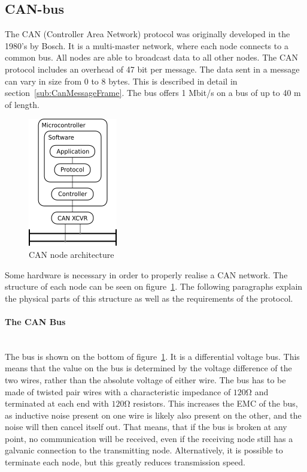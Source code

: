 
\subsection{CAN-bus}\label{sec:CAN-bus}
The CAN (Controller Area Network) protocol was originally developed in the 1980's by Bosch.
It is a multi-master network, where each node connects to a common bus.
All nodes are able to broadcast data to all other nodes.
The CAN protocol includes an overhead of 47 bit per message.
The data sent in a message can vary in size from 0 to 8 bytes.
This is described in detail in section~\ref{sub:CanMessageFrame}.
The bus offers 1 Mbit/s on a bus of up to 40 \si{\metre} of length.

\begin{figure}[h!]
	\centering
	\includegraphics{graphics/canbus_setup}
	\caption{CAN node architecture}
	\label{fig:canbus_setup}
\end{figure}

Some hardware is necessary in order to properly realise a CAN network.
The structure of each node can be seen on figure~\ref{fig:canbus_setup}.
The following paragraphs explain the physical parts of this structure as well as the requirements of the protocol.

\paragraph*{The CAN Bus}~\\
The bus is shown on the bottom of figure~\ref{fig:canbus_setup}.
It is a differential voltage bus.
This means that the value on the bus is determined by the voltage difference of the two wires, rather than the absolute voltage of either wire.
The bus has to be made of twisted pair wires with a characteristic impedance of $\si{120 \ohm}$ and terminated at each end with $\si{120 \ohm}$ resistors.
This increases the EMC of the bus, as inductive noise present on one wire is likely also present on the other, and the noise will then cancel itself out.
That means, that if the bus is broken at any point, no communication will be received, even if the receiving node still has a galvanic connection to the transmitting node.
Alternatively, it is possible to terminate each node, but this greatly reduces transmission speed.\\

